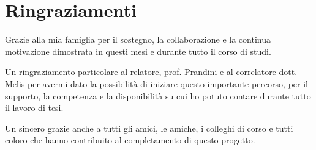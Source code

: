 \chapter*{Ringraziamenti}


Grazie alla mia famiglia per il sostegno, la collaborazione e la continua motivazione dimostrata in questi mesi e durante tutto il corso di studi.

Un ringraziamento particolare al relatore, prof. Prandini e al correlatore dott. Melis per avermi dato la possibilit\`a di iniziare questo importante percorso, per il supporto, la competenza e la disponibilit\`a su cui ho potuto contare durante tutto il lavoro di tesi.

Un sincero grazie anche a tutti gli amici, le amiche, i colleghi di corso e tutti coloro che hanno contribuito al completamento di questo progetto. 